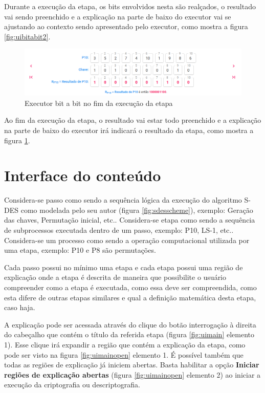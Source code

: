 Durante a execução da etapa, os bits envolvidos nesta são realçados, o resultado vai sendo preenchido e a explicação na parte de baixo do executor vai se ajustando ao contexto sendo apresentado pelo executor, como mostra a figura \ref{fig:uibitabit2}.

\begin{figure}[H]
    \centering
    \caption{Executor bit a bit no fim da execução da etapa}
    \label{fig:uibitabit3}
    \includegraphics[width=1\linewidth]{UI/UIBitABit3.png}
\end{figure}

Ao fim da execução da etapa, o resultado vai estar todo preenchido e a explicação na parte de baixo do executor irá indicará o resultado da etapa, como mostra a figura \ref{fig:uibitabit3}.

\section{Interface do conteúdo}
Considera-se passo como sendo a sequência lógica da execução do algoritmo S-DES como modelada pelo seu autor (figura \ref{fig:sdesscheme}), exemplo: Geração das chaves, Permutação inicial, etc.. Considera-se etapa como sendo a sequência de subprocessos executada dentro de um passo, exemplo: P10, LS-1, etc.. Considera-se um processo como sendo a operação computacional utilizada por uma etapa, exemplo: P10 e P8 são permutações.

Cada passo possui no mínimo uma etapa e cada etapa possui uma região de explicação onde a etapa é descrita de maneira que possibilite o usuário compreender como a etapa é executada, como essa deve ser compreendida, como esta difere de outras etapas similares e qual a definição matemática desta etapa, caso haja.

A explicação pode ser acessada através do clique do botão interrogação à direita do cabeçalho que contém o título da referida etapa (figura \ref{fig:uimain} elemento 1). Esse clique irá expandir a região que contém a explicação da etapa, como pode ser visto na figura \ref{fig:uimainopen} elemento 1. É possível também que todas as regiões de explicação já iniciem abertas. Basta habilitar a opção \textbf{Iniciar regiões de explicação abertas} (figura \ref{fig:uimainopen} elemento 2) ao iniciar a execução da criptografia ou descriptografia.

